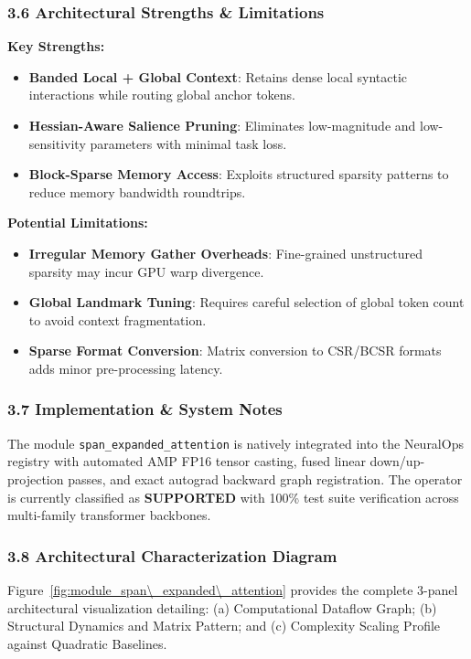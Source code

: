 \subsubsection*{3.6 Architectural Strengths \& Limitations}
\textbf{Key Strengths:}
\begin{itemize}
    \item \textbf{Banded Local + Global Context}: Retains dense local syntactic interactions while routing global anchor tokens.
    \item \textbf{Hessian-Aware Salience Pruning}: Eliminates low-magnitude and low-sensitivity parameters with minimal task loss.
    \item \textbf{Block-Sparse Memory Access}: Exploits structured sparsity patterns to reduce memory bandwidth roundtrips.
\end{itemize}

\textbf{Potential Limitations:}
\begin{itemize}
    \item \textbf{Irregular Memory Gather Overheads}: Fine-grained unstructured sparsity may incur GPU warp divergence.
    \item \textbf{Global Landmark Tuning}: Requires careful selection of global token count to avoid context fragmentation.
    \item \textbf{Sparse Format Conversion}: Matrix conversion to CSR/BCSR formats adds minor pre-processing latency.
\end{itemize}

\subsubsection*{3.7 Implementation \& System Notes}
The module \texttt{span\_expanded\_attention} is natively integrated into the NeuralOps registry with automated AMP FP16 tensor casting, fused linear down/up-projection passes, and exact autograd backward graph registration. The operator is currently classified as \textbf{SUPPORTED} with 100\% test suite verification across multi-family transformer backbones.

\subsubsection*{3.8 Architectural Characterization Diagram}
Figure~\ref{fig:module_span\_expanded\_attention} provides the complete 3-panel architectural visualization detailing: (a) Computational Dataflow Graph; (b) Structural Dynamics and Matrix Pattern; and (c) Complexity Scaling Profile against Quadratic Baselines.

